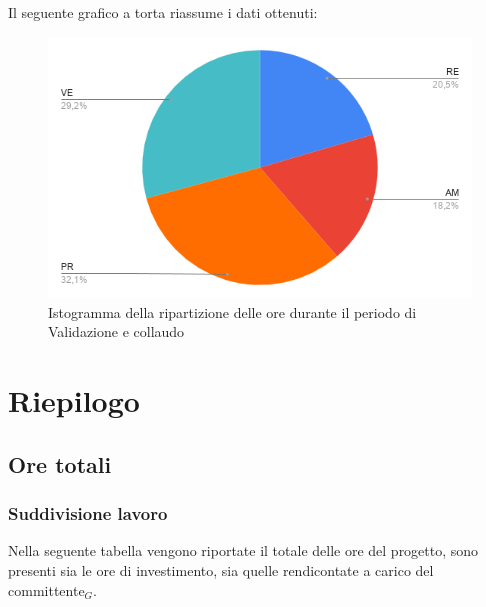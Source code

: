 {{{{{{{{{{Il seguente grafico a torta riassume i dati ottenuti:
\begin{figure}[!ht]
	\begin{center}
		\includegraphics[width=0.8\linewidth]{../immagini/pdp/torta_validazione.png}
		\caption{Istogramma della ripartizione delle ore durante il periodo di Validazione e
			collaudo}
	\end{center}
\end{figure}

\section{Riepilogo}\label{PreventivoRiepilogo}

\subsection{Ore totali}\label{PreventivoRiepilogoOreTotali}

\subsubsection{Suddivisione lavoro}\label{PreventivoRiepilogoOreTotaliSuddivisioneDelLavoro}
Nella seguente tabella vengono riportate il totale delle ore del progetto, sono presenti sia le ore di investimento, sia quelle rendicontate a carico del committente$_G$.
\quad
\def\tabularxcolumn#1{m{#1}}
{
	
}}}}}}}}}}}

